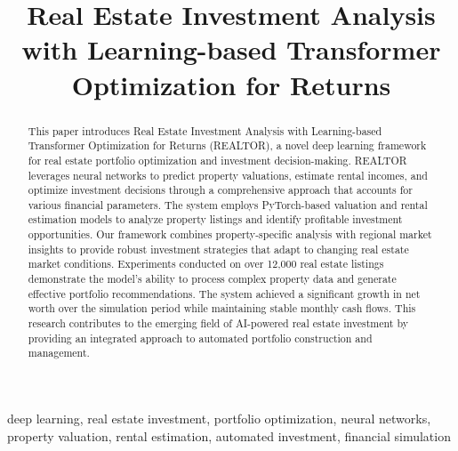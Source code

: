 \documentclass[conference]{IEEEtran}
\begin{document}
\title{Real Estate Investment Analysis with Learning-based Transformer Optimization for Returns}

\author{
\and
{}
}

\maketitle

\begin{abstract}
This paper introduces Real Estate Investment Analysis with Learning-based Transformer Optimization for Returns (REALTOR), a novel deep learning framework for real estate portfolio optimization and investment decision-making. REALTOR leverages neural networks to predict property valuations, estimate rental incomes, and optimize investment decisions through a comprehensive approach that accounts for various financial parameters. The system employs PyTorch-based valuation and rental estimation models to analyze property listings and identify profitable investment opportunities. Our framework combines property-specific analysis with regional market insights to provide robust investment strategies that adapt to changing real estate market conditions. Experiments conducted on over 12,000 real estate listings demonstrate the model's ability to process complex property data and generate effective portfolio recommendations. The system achieved a significant growth in net worth over the simulation period while maintaining stable monthly cash flows. This research contributes to the emerging field of AI-powered real estate investment by providing an integrated approach to automated portfolio construction and management.
\end{abstract}

\begin{IEEEkeywords}
deep learning, real estate investment, portfolio optimization, neural networks, property valuation, rental estimation, automated investment, financial simulation
\end{IEEEkeywords}
\end{document}
